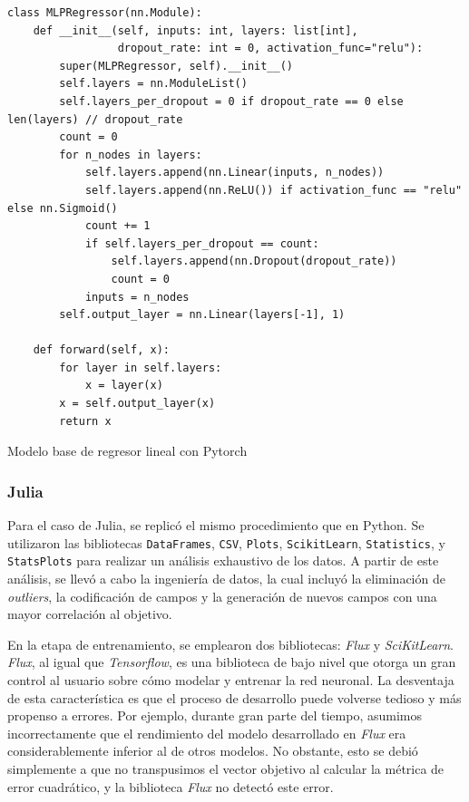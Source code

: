 \documentclass[11pt]{article}
\let\Oldsubsubsection\subsubsection
\renewcommand{\subsubsection}{\FloatBarrier\Oldsubsubsection}
\begin{document}
\begin{listing}[H]
\begin{verbatim}
class MLPRegressor(nn.Module):
    def __init__(self, inputs: int, layers: list[int],
                 dropout_rate: int = 0, activation_func="relu"):
        super(MLPRegressor, self).__init__()
        self.layers = nn.ModuleList()
        self.layers_per_dropout = 0 if dropout_rate == 0 else len(layers) // dropout_rate
        count = 0
        for n_nodes in layers:
            self.layers.append(nn.Linear(inputs, n_nodes))
            self.layers.append(nn.ReLU()) if activation_func == "relu" else nn.Sigmoid()
            count += 1
            if self.layers_per_dropout == count:
                self.layers.append(nn.Dropout(dropout_rate))
                count = 0
            inputs = n_nodes
        self.output_layer = nn.Linear(layers[-1], 1)
        
    def forward(self, x):
        for layer in self.layers:
            x = layer(x)
        x = self.output_layer(x)
        return x
\end{verbatim}
\caption{Modelo base de regresor lineal con Pytorch}
\label{code:nn:python_pytorch}
\end{listing}

\subsubsection{Julia}

Para el caso de Julia, se replicó el mismo procedimiento que en Python. Se utilizaron las bibliotecas \lstinline{DataFrames}, \lstinline{CSV}, \lstinline{Plots}, \lstinline{ScikitLearn}, \lstinline{Statistics}, y \lstinline{StatsPlots} para realizar un análisis exhaustivo de los datos. A partir de este análisis, se llevó a cabo la ingeniería de datos, la cual incluyó la eliminación de \textit{outliers}, la codificación de campos y la generación de nuevos campos con una mayor correlación al objetivo.

En la etapa de entrenamiento, se emplearon dos bibliotecas: \textit{Flux} y \textit{SciKitLearn}. \textit{Flux}, al igual que \textit{Tensorflow}, es una biblioteca de bajo nivel que otorga un gran control al usuario sobre cómo modelar y entrenar la red neuronal. La desventaja de esta característica es que el proceso de desarrollo puede volverse tedioso y más propenso a errores. Por ejemplo, durante gran parte del tiempo, asumimos incorrectamente que el rendimiento del modelo desarrollado en \textit{Flux} era considerablemente inferior al de otros modelos. No obstante, esto se debió simplemente a que no transpusimos el vector objetivo al calcular la métrica de error cuadrático, y la biblioteca \textit{Flux} no detectó este error.
\end{document}
